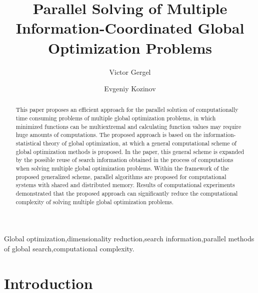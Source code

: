 \documentclass[review]{elsarticle}
\begin{document}
\begin{frontmatter}

\title{Parallel Solving of Multiple Information-Coordinated Global Optimization Problems}


\author[mymainaddress]{Victor Gergel}

\author[mymainaddress]{Evgeniy Kozinov}

\address[mymainaddress]{Institute of Informational Technologies, Mathematics and Mechanics, Mathematical Center, Lobachevsky State University of Nizhny Novgorod, Nizhni Novgorod, Russia}



\begin{abstract}
This paper proposes an efficient approach for the parallel solution of computationally time consuming problems of multiple global optimization problems, in which minimized functions can be multiextremal and calculating function values may require huge amounts of computations. The proposed approach is based on the information-statistical theory of global optimization, at which a general computational scheme of global optimization methods is proposed. In the paper, this general scheme is expanded by the possible reuse of search information obtained in the process of computations when solving multiple global optimization problems. Within the framework of the proposed generalized scheme, parallel algorithms are proposed for computational systems with shared and distributed memory. Results of computational experiments demonstrated that the proposed approach can significantly reduce the computational complexity of solving multiple global optimization problems.
\end{abstract}

\begin{keyword}
Global optimization\sep dimensionality reduction\sep search information\sep parallel methods of global search\sep computational complexity.
\end{keyword}

\end{frontmatter}

\linenumbers


\section{Introduction}\label{sec:1}
\end{document}
